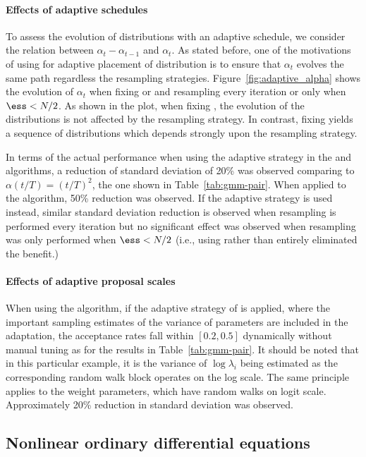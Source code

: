 \paragraph{Effects of adaptive schedules} To assess the evolution of
distributions with an adaptive schedule, we consider the relation between
$\alpha_t - \alpha_{t-1}$ and $\alpha_t$. As stated before, one of the
motivations of using \cess for adaptive placement of distribution is to
ensure that $\alpha_t$ evolves the same path regardless the resampling
strategies. Figure~\ref{fig:adaptive_alpha} shows the evolution of $\alpha_t$
when fixing \ess or \cess and resampling every iteration or only when $\ess <
N/2$. As shown in the plot, when fixing \cess, the evolution of the
distributions is not affected by the resampling strategy. In contrast, fixing
\ess yields a sequence of distributions which depends strongly upon the
resampling strategy.

In terms of the actual performance when using the \cess adaptive strategy in
the \smc[2] and \ais algorithms, a reduction of standard deviation of 20\% was
observed comparing to $\alpha(t/T) = (t/T)^2$, the one shown in
Table~\ref{tab:gmm-pair}. When applied to the \smc[3] algorithm, 50\%
reduction was observed. If the \ess adaptive strategy is used instead,
similar standard deviation reduction is observed when resampling is performed
every iteration but no significant effect was observed when resampling
was only performed when $\ess < N/2$ (i.e., using \ess rather than \cess
entirely eliminated the benefit.)

\paragraph{Effects of adaptive proposal scales} When using the \smc[2]
algorithm, if the adaptive strategy of \cite{Andrieu:2006tw} is applied,
where the important sampling estimates of the variance of parameters are
included in the adaptation, the acceptance rates fall within $[0.2, 0.5]$
dynamically without manual tuning as for the results in
Table~\ref{tab:gmm-pair}. It should be noted that in this particular example,
it is the variance of $\log\lambda_i$ being estimated as the corresponding
random walk block operates on the log scale. The same principle applies to
the weight parameters, which have random walks on logit scale.
Approximately 20\% reduction in standard deviation was observed.

\subsection{Nonlinear ordinary differential equations}
\label{sub:Nonlinear ordinary differential equations}

